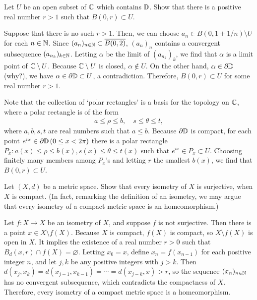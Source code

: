 \begin{prob}
    Let $U$ be an open subset of ${\mathbb{C}}$ which contains ${\mathbb{D}}$.
    Show that there is a positive real number $r>1$ such that $B(0, r)\subset U$.
\end{prob}
\begin{sol}
    Suppose that there is no such $r>1$.
    Then, we can choose $a_n\in B(0, 1+1/n)\setminus U$ for each $n\in{\mathbb{N}}$.
    Since $(a_n)_{n\in{\mathbb{N}}}\subset\overline{B(0, 2)}$, $(a_n)_n$ contains a convergent subsequence $(a_{n_k})_{k\in{\mathbb{N}}}$.
    Letting $\alpha$ be the limit of $(a_{n_k})_k$, we find that $\alpha$ is a limit point of ${\mathbb{C}}\setminus U$.
    Because ${\mathbb{C}}\setminus U$ is closed, $\alpha\notin U$.
    On the other hand, $\alpha\in\partial{\mathbb{D}}$ \color{brown}(why?)\color{black}, we have $\alpha\in\partial{\mathbb{D}}\subset U$, a contradiction.
    Therefore, $B(0, r)\subset U$ for some real number $r>1$.
\end{sol}
\begin{sol}
    Note that the collection of `polar rectangles' is a basis for the topology on ${\mathbb{C}}$, where a polar rectangle is of the form
    \begin{align*}
        a\leq \rho\leq b,\quad s\leq \theta\leq t,
    \end{align*}
    where $a, b, s, t$ are real numbers such that $a\leq b$.
    Because $\partial{\mathbb{D}}$ is compact, for each point $e^{ix}\in\partial{\mathbb{D}}\,(0\leq x<2\pi)$ there is a polar rectangle $P_x: a(x)\leq \rho\leq b(x), s(x)\leq \theta\leq t(x)$ such that $e^{ix}\in P_x\subset U$.
    Choosing finitely many members among $P_x$'s and letting $r$ the smallest $b(x)$, we find that $B(0, r)\subset U$.
\end{sol}

\begin{prob}
    Let $(X, d)$ be a metric space.
    Show that every isometry of $X$ is surjective, when $X$ is compact.
    (In fact, remarking the definition of an isometry, we may argue that every isometry of a compact metric space is an homeomorphism.)
\end{prob}
\begin{sol}
    Let $f: X\rightarrow X$ be an isometry of $X$, and suppose $f$ is not surjective.
    Then there is a point $x\in X\setminus f(X)$.
    Because $X$ is compact, $f(X)$ is compact, so $X\setminus f(X)$ is open in $X$.
    It implies the existence of a real number $r>0$ such that $B_d(x, r)\cap f(X)=\varnothing$.
    Letting $x_0=x$, define $x_n=f(x_{n-1})$ for each positive integer $n$, and let $j, k$ be any positive integers with $j>k$.
    Then $d(x_j, x_k)=d(x_{j-1}, x_{k-1})=\cdots=d(x_{j-k}, x)>r$, so the sequence $(x_n)_{n\in{\mathbb{N}}}$ has no convergent subsequence, which contradicts the compactness of $X$.
    Therefore, every isometry of a compact metric space is a homeomorphism.
\end{sol}